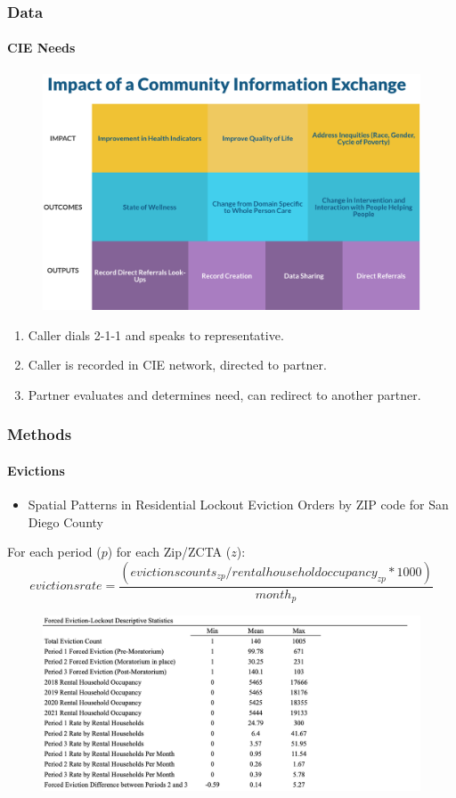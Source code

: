 \documentclass{beamer} %
\begin{document}
\begin{frame}
\frametitle{Data}
\framesubtitle{CIE Needs}
\begin{figure}
\includegraphics[width=0.85\linewidth]{figures/impact_CIE.png}
\end{figure}

\begin{enumerate}
	\item Caller dials 2-1-1 and speaks to representative.
	\item Caller is recorded in CIE network, directed to partner.
	\item Partner evaluates and determines need, can redirect to another partner.
\end{enumerate}


\end{frame}



\begin{frame}
\frametitle{Methods}
\framesubtitle{Evictions}

\begin{itemize}
\item Spatial Patterns in Residential Lockout Eviction Orders by ZIP code for San Diego County
\end{itemize}

\vspace{10pt} %
For each period ($p$) for each Zip/ZCTA ($z$):
$$evictionsrate = \frac{(evictionscounts_{zp}/rentalhouseholdoccupancy_{zp} * 1000)}{month_{p}}$$

\begin{figure}
\includegraphics[width=0.85\linewidth]{figures/Table_1_FEviction_DescriptiveSTATS.png}
  \label{fig:desc_stats}
\end{figure}
\end{frame}
\end{document}
